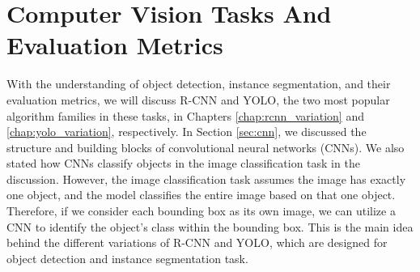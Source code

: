 \chapter{Computer Vision Tasks And Evaluation Metrics} \label{chap:segmentation_metric}





With the understanding of object detection, instance segmentation, and their evaluation metrics, we will discuss R-CNN and YOLO, the two most popular algorithm families in these tasks, in Chapters \ref{chap:rcnn_variation} and \ref{chap:yolo_variation}, respectively. In Section \ref{sec:cnn}, we discussed the structure and building blocks of convolutional neural networks (CNNs). We also stated how CNNs classify objects in the image classification task in the discussion. However,  the image classification task assumes the image has exactly one object, and the model classifies the entire image based on that one object. Therefore, if we consider each bounding box as its own image, we can utilize a CNN to identify the object's class within the bounding box. This is the main idea behind the different variations of R-CNN and YOLO, which are designed for object detection and instance segmentation task. 